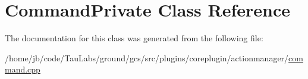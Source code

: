 \hypertarget{class_command_private}{\section{\-Command\-Private \-Class \-Reference}
\label{class_command_private}
}


\-The documentation for this class was generated from the following file\-:\begin{DoxyCompactItemize}
\item 
/home/jb/code/\-Tau\-Labs/ground/gcs/src/plugins/coreplugin/actionmanager/\hyperlink{command_8cpp}{command.\-cpp}\end{DoxyCompactItemize}
